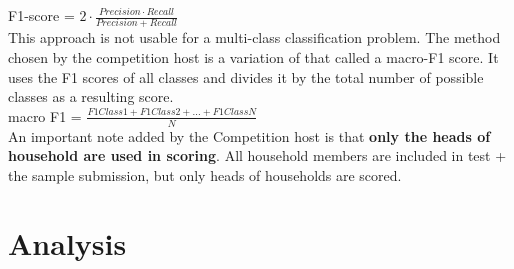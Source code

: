 \documentclass[preprint,12pt]{elsarticle}
\begin{document}
F1-score = $2\cdot\frac{Precision \cdot Recall}{Precision + Recall}$\\

This approach is not usable for a multi-class classification problem. The method chosen by the competition host is a variation of that called a macro-F1 score. It uses the F1 scores of all classes and divides it by the total number of possible classes as a resulting score.\\

macro F1 = $\frac{F1Class 1 + F1Class 2 + ... + F1 ClassN}{N}$\\

An important note added by the Competition host is that \textbf{only the heads of household are used in scoring}. All household members are included in test + the sample submission, but only heads of households are scored.

\section{Analysis}
\label{S:2}
\end{document}
